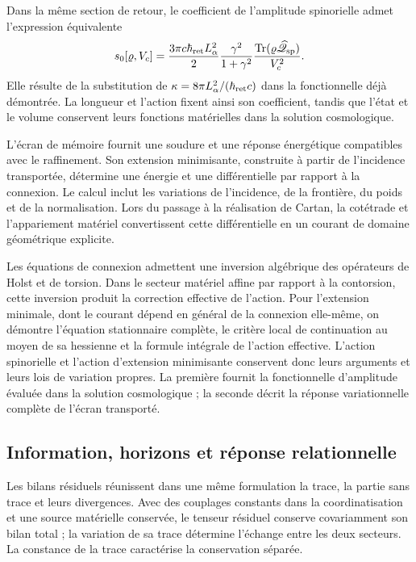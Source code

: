Dans la même section de retour, le coefficient de l'amplitude spinorielle admet l'expression équivalente
\[
 s_0[\varrho,V_c]
 =\frac{3\pi c\hbar_{\rm ret}L_\alpha^2}{2}
   \frac{\gamma^2}{1+\gamma^2}
   \frac{\operatorname{Tr}(\varrho\widehat{\mathscr Q}_{\rm sp})}{V_c^2}.
\]
Elle résulte de la substitution de \(\kappa=8\pi L_\alpha^2/(\hbar_{\rm ret}c)\) dans la fonctionnelle déjà démontrée. La longueur et l'action fixent ainsi son coefficient, tandis que l'état et le volume conservent leurs fonctions matérielles dans la solution cosmologique.

L'écran de mémoire fournit une soudure et une réponse
énergétique compatibles avec le raffinement. Son extension minimisante,
construite à partir de l'incidence transportée, détermine une
énergie et une différentielle par rapport à la connexion. Le calcul inclut
les variations de l'incidence, de la frontière, du poids et de la normalisation. Lors du
passage à la réalisation de Cartan, la cotétrade et l'appariement
matériel convertissent cette différentielle en un courant de domaine
géométrique explicite.

Les équations de connexion admettent une inversion algébrique des opérateurs de Holst et de torsion. Dans le secteur matériel affine par rapport à la contorsion, cette inversion produit la correction effective de l'action. Pour l'extension minimale, dont le courant dépend en général de la connexion elle-même, on démontre l'équation stationnaire complète, le critère local de continuation au moyen de sa hessienne et la formule intégrale de l'action effective. L'action spinorielle et l'action d'extension minimisante conservent donc leurs arguments et leurs lois de variation propres. La première fournit la fonctionnelle d'amplitude évaluée dans la solution cosmologique ; la seconde décrit la réponse variationnelle complète de l'écran transporté.

\subsection{Information, horizons et réponse relationnelle}

Les bilans résiduels réunissent dans une même formulation la trace, la partie sans trace et leurs divergences. Avec des couplages constants dans la coordinatisation et une source matérielle conservée, le tenseur résiduel conserve covariamment son bilan total ; la variation de sa trace détermine l'échange entre les deux secteurs. La constance de la trace caractérise la conservation séparée.


